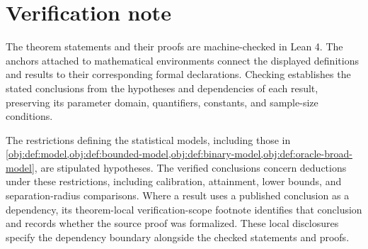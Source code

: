 \section{Verification note}

The theorem statements and their proofs are machine-checked in Lean 4. The anchors attached to mathematical environments connect the displayed definitions and results to their corresponding formal declarations. Checking establishes the stated conclusions from the hypotheses and dependencies of each result, preserving its parameter domain, quantifiers, constants, and sample-size conditions.

The restrictions defining the statistical models, including those in \cref{obj:def:model,obj:def:bounded-model,obj:def:binary-model,obj:def:oracle-broad-model}, are stipulated hypotheses. The verified conclusions concern deductions under these restrictions, including calibration, attainment, lower bounds, and separation-radius comparisons. Where a result uses a published conclusion as a dependency, its theorem-local verification-scope footnote identifies that conclusion and records whether the source proof was formalized. These local disclosures specify the dependency boundary alongside the checked statements and proofs.
